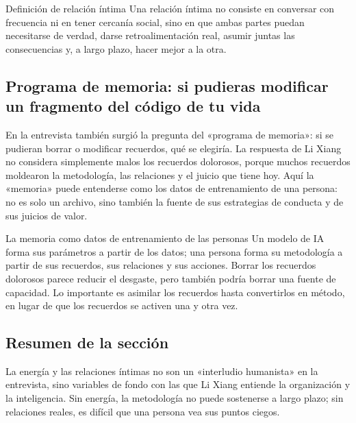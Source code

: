 \begin{importantbox}{Definición de relación íntima}
Una relación íntima no consiste en conversar con frecuencia ni en tener cercanía social, sino en que ambas partes puedan necesitarse de verdad, darse retroalimentación real, asumir juntas las consecuencias y, a largo plazo, hacer mejor a la otra.
\end{importantbox}

\subsection{Programa de memoria: si pudieras modificar un fragmento del código de tu vida}

En la entrevista también surgió la pregunta del «programa de memoria»: si se pudieran borrar o modificar recuerdos, qué se elegiría. La respuesta de Li Xiang no considera simplemente malos los recuerdos dolorosos, porque muchos recuerdos moldearon la metodología, las relaciones y el juicio que tiene hoy. Aquí la «memoria» puede entenderse como los datos de entrenamiento de una persona: no es solo un archivo, sino también la fuente de sus estrategias de conducta y de sus juicios de valor.

\begin{knowledgebox}{La memoria como datos de entrenamiento de las personas}
Un modelo de IA forma sus parámetros a partir de los datos; una persona forma su metodología a partir de sus recuerdos, sus relaciones y sus acciones. Borrar los recuerdos dolorosos parece reducir el desgaste, pero también podría borrar una fuente de capacidad. Lo importante es asimilar los recuerdos hasta convertirlos en método, en lugar de que los recuerdos se activen una y otra vez.
\end{knowledgebox}

\subsection{Resumen de la sección}

La energía y las relaciones íntimas no son un «interludio humanista» en la entrevista, sino variables de fondo con las que Li Xiang entiende la organización y la inteligencia. Sin energía, la metodología no puede sostenerse a largo plazo; sin relaciones reales, es difícil que una persona vea sus puntos ciegos.

